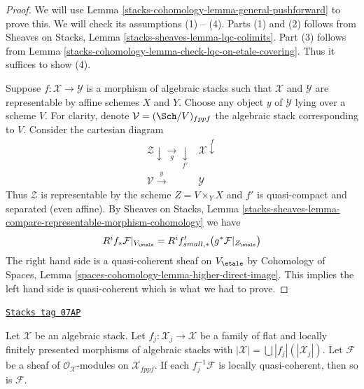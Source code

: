 \begin{proof}
We will use
Lemma \ref{stacks-cohomology-lemma-general-pushforward}
to prove this. We will check its assumptions (1) -- (4).
Parts (1) and (2) follows from
Sheaves on Stacks, Lemma \ref{stacks-sheaves-lemma-lqc-colimits}.
Part (3) follows from
Lemma \ref{stacks-cohomology-lemma-check-lqc-on-etale-covering}.
Thus it suffices to show (4).

\medskip\noindent
Suppose $f : \mathcal{X} \to \mathcal{Y}$ is a morphism of algebraic stacks
such that $\mathcal{X}$ and $\mathcal{Y}$ are representable by affine
schemes $X$ and $Y$. Choose any object $y$ of $\mathcal{Y}$ lying over a
scheme $V$. For clarity, denote $\mathcal{V} = (\Sch/V)_{fppf}$ the
algebraic stack corresponding to $V$. Consider the cartesian diagram
$$
\begin{array}{cc}\mathcal{Z} \downarrow\underset{g}{\longrightarrow}\underset{f'}{\downarrow} & \mathcal{X} \overset{f}{\downarrow} \\ \mathcal{V} \overset{y}{\longrightarrow} & \mathcal{Y}\end{array}
$$
Thus $\mathcal{Z}$ is representable by the scheme $Z = V \times_Y X$
and $f'$ is quasi-compact and separated (even affine). By
Sheaves on Stacks, Lemma
\ref{stacks-sheaves-lemma-compare-representable-morphism-cohomology}
we have
$$
R^if_*\mathcal{F}|_{V_\etale} =
R^if'_{small, *}\big(g^*\mathcal{F}|_{Z_\etale}\big)
$$
The right hand side is a quasi-coherent sheaf on $V_\etale$ by
Cohomology of Spaces, Lemma
\ref{spaces-cohomology-lemma-higher-direct-image}.
This implies the left hand side is quasi-coherent which is what
we had to prove.
\end{proof}

\begin{lemma}
\label{stacks-cohomology-lemma-check-lqc-on-flat-covering}
\href{https://stacks.math.columbia.edu/tag/07AP}{\texttt{Stacks tag 07AP}}

Let $\mathcal{X}$ be an algebraic stack. Let
$f_j : \mathcal{X}_j \to \mathcal{X}$ be a family of flat
and locally finitely presented morphisms of algebraic stacks with
$|\mathcal{X}| =\bigcup |f_j|(|\mathcal{X}_j|)$.
Let $\mathcal{F}$ be a sheaf of $\mathcal{O}_\mathcal{X}$-modules
on $\mathcal{X}_{fppf}$. If each $f_j^{-1}\mathcal{F}$
is locally quasi-coherent, then so is $\mathcal{F}$.
\end{lemma}

